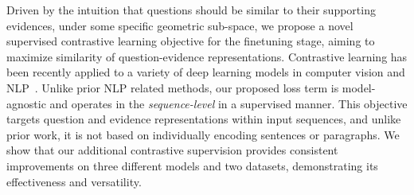 




Driven by the intuition that questions should be similar to their supporting evidences, under some specific geometric sub-space, we propose a novel supervised contrastive learning objective for the finetuning stage, aiming to maximize similarity of question-evidence representations. Contrastive learning has been recently applied to a variety of deep learning models in computer vision \cite{chen2020simple, chen2021exploring} and NLP~\cite{gao-etal-2021-simcse,gunel2021supervised}. Unlike prior NLP related methods, our proposed loss term is model-agnostic and operates in the \textit{sequence-level} in a supervised manner. This objective targets question and evidence representations within input sequences, and unlike prior work, it is not based on individually encoding sentences or paragraphs.  We show that our additional contrastive supervision provides consistent improvements on three different models and two datasets, demonstrating its effectiveness and versatility. 
